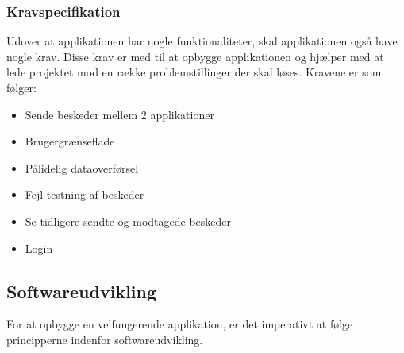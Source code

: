 \subsubsection{Kravspecifikation}
Udover at applikationen har nogle funktionaliteter, skal applikationen også have nogle krav. Disse krav er med til at opbygge applikationen og hjælper med at lede projektet mod en række problemstillinger der skal løses.
\newline
Kravene er som følger:
\begin{itemize}
	\item Sende beskeder mellem 2 applikationer
	\item Brugergrænseflade
	\item Pålidelig dataoverførsel
	\item Fejl testning af beskeder
	\item Se tidligere sendte og modtagede beskeder
	\item Login
\end{itemize}

\subsection{Softwareudvikling}
For at opbygge en velfungerende applikation,  er det imperativt at følge principperne indenfor softwareudvikling.

